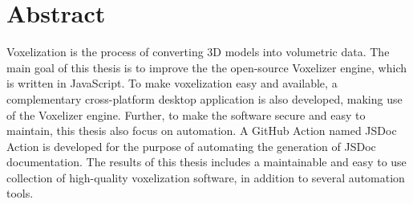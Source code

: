 \section*{Abstract}
Voxelization is the process of converting 3D models into volumetric data. The main goal of this thesis is to improve the the open-source Voxelizer engine, which is written in JavaScript. To make voxelization easy and available, a complementary cross-platform desktop application is also developed, making use of the Voxelizer engine. Further, to make the software secure and easy to maintain, this thesis also focus on automation. A GitHub Action named JSDoc Action is developed for the purpose of automating the generation of JSDoc documentation. The results of this thesis includes a maintainable and easy to use collection of high-quality voxelization software, in addition to several automation tools.

